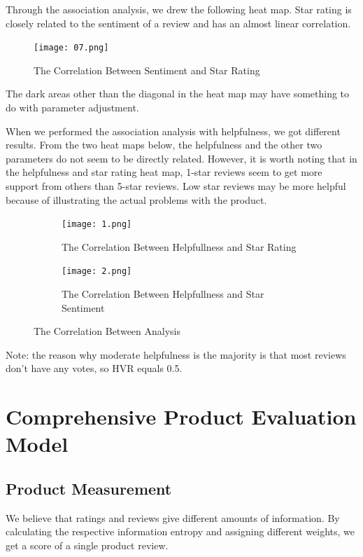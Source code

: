 \documentclass[12pt]{article}  %
\begin{document}
Through the association analysis, we drew the following heat map. Star rating is closely related to the sentiment of a review and has an almost linear correlation. 

\begin{figure}[htbp]
	\centering
	\texttt{[image: 07.png]}
	\caption{The Correlation Between Sentiment and Star Rating}\label{fig:fig5}
\end{figure}

The dark areas other than the diagonal in the heat map may have something to do with parameter adjustment.

When we performed the association analysis with helpfulness, we got different results. From the two heat maps below, the helpfulness and the other two parameters do not seem to be directly related. However, it is worth noting that in the helpfulness and star rating heat map, 1-star reviews seem to get more support from others than 5-star reviews. Low star reviews may be more helpful because of illustrating the actual problems with the product.

\begin{figure}[h]
	\centering
	\begin{subfigure}[b]{.45\textwidth}
		\centering
		\texttt{[image: 1.png]}
		\caption{The Correlation Between Helpfullness and Star Rating}
	\end{subfigure}
	\begin{subfigure}[b]{.45\textwidth}
		\centering
		\texttt{[image: 2.png]}
		\caption{The Correlation Between Helpfullness and Star Sentiment}
	\end{subfigure}	
	\caption{The Correlation Between Analysis}
	\label{fig:fig6}
\end{figure}

Note: the reason why moderate helpfulness is the majority is that most reviews don't have any votes, so HVR equals 0.5.


\section{Comprehensive Product Evaluation Model}
\subsection{Product Measurement}

We believe that ratings and reviews give different amounts of information. By calculating the respective information entropy and assigning different weights, we get a score of a single product review.
\end{document}
